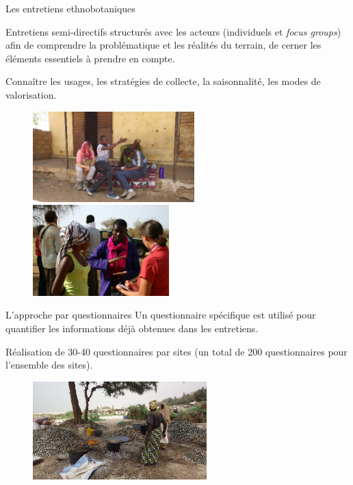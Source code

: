 \documentclass[newPxFont]{beamer}
\begin{document}
\begin{frame}[c]{Les entretiens ethnobotaniques}
\vspace{-1cm}

Entretiens semi-directifs structurés avec les acteurs (individuels et \textit{focus groups}) afin de comprendre la problématique et les réalités du terrain, de cerner les éléments essentiels à prendre en compte.

Connaître les usages, les stratégies de collecte, la saisonnalité, les modes de valorisation.


\begin{figure}
	\centering
	\includegraphics[height = 3.5cm]{img/group3.png}~
  \includegraphics[height = 3.5cm]{img/group2.png}
\end{figure}
\end{frame}

\begin{frame}[c]{L'approche par questionnaires}
\vspace{-1cm}
Un questionnaire spécifique est utilisé pour quantifier les informations déjà obtenues dans les entretiens.

Réalisation de 30-40 questionnaires par sites (un total de 200 questionnaires pour l’ensemble des sites).
\begin{figure}
	\centering
	\includegraphics[width = 0.6\textwidth]{img/Khoudia.png}
\end{figure}

\end{frame}
\end{document}
